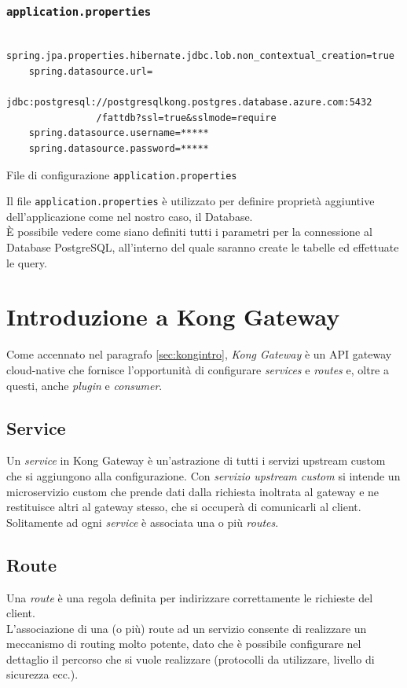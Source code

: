 \subsubsection{\texttt{application.properties}}
\begin{algorithm}
\centering
\begin{verbatim}
	spring.jpa.properties.hibernate.jdbc.lob.non_contextual_creation=true
	spring.datasource.url=
		jdbc:postgresql://postgresqlkong.postgres.database.azure.com:5432
				/fattdb?ssl=true&sslmode=require
	spring.datasource.username=*****
	spring.datasource.password=*****
\end{verbatim}
\caption{File di configurazione \texttt{application.properties}}\label{alg:applicationproperties}
\end{algorithm}
Il file \texttt{application.properties} è utilizzato per definire proprietà aggiuntive dell'applicazione come nel nostro caso, il Database.\\
È possibile vedere come siano definiti tutti i parametri per la connessione al Database PostgreSQL, all'interno del quale saranno 
create le tabelle ed effettuate le query.

\newpage

\section{Introduzione a Kong Gateway}\label{sec:kongprog}
Come accennato nel paragrafo \ref{sec:kongintro}, \emph{Kong Gateway} è un API gateway cloud-native che fornisce l'opportunità di configurare \emph{services} e \emph{routes} e, oltre a questi, anche \emph{plugin} e \emph{consumer}.
\subsection{Service}\label{sec:kongservice}
Un \emph{service} in Kong Gateway è un'astrazione di tutti i servizi upstream custom che si aggiungono alla configurazione. Con \emph{servizio upstream custom} si intende un microservizio custom che prende dati dalla richiesta inoltrata al gateway e ne restituisce altri al gateway stesso, che si occuperà di comunicarli al client.\\
Solitamente ad ogni \emph{service} è associata una o più \emph{routes}. \cite{Kong}\\

\subsection{Route}\label{sec:kongroute}
Una \emph{route} è una regola definita per indirizzare correttamente le richieste del client.\\
L'associazione di una (o più) route ad un servizio consente di realizzare un meccanismo di routing molto potente, dato che è possibile configurare
 nel dettaglio il percorso che si vuole realizzare (protocolli da utilizzare, livello di sicurezza ecc.). \cite{Kong}

